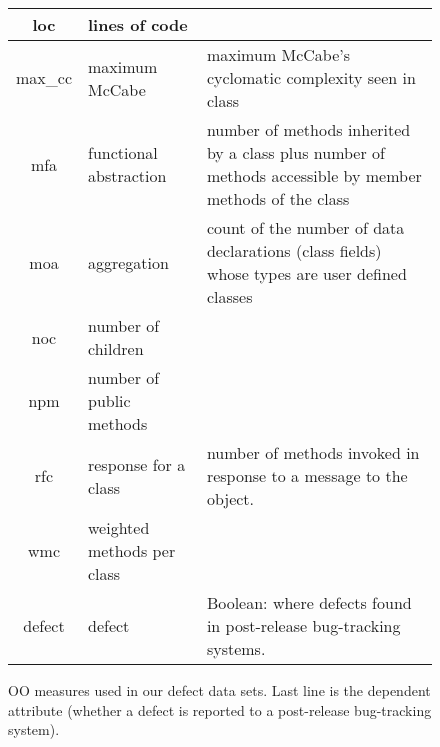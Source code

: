 \documentclass[12pt, journal, compsoc]{IEEEtran}
\begin{document}
\begin{figure*}[htbp!]
\begin{center}
{\begin{tabular}{c|l|p{4.7in}}
        loc & lines of code &\\\hline
        max\_cc & maximum McCabe & maximum McCabe's cyclomatic complexity seen
        in class\\\hline
        mfa & functional abstraction & number of methods inherited by a class
        plus number of methods accessible by member methods of the
        class\\\hline
        moa &  aggregation &  count of the number of data declarations (class
        fields) whose types are user defined classes\\\hline
        noc &  number of children &\\\hline
        npm & number of public methods & \\\hline
        rfc & response for a class &number of  methods invoked in response to
        a message to the object.\\\hline
        wmc & weighted methods per class &\\\hline
        \rowcolor{lightgray}
        defect & defect & Boolean: where defects found in post-release bug-tracking systems.
      \end{tabular}
    }
  \end{center}
  \caption{OO measures used in our defect data sets.  Last line is
    the dependent attribute (whether a defect is reported to  a
    post-release bug-tracking system).}\label{fig:ck}
\end{figure*}
\end{document}
